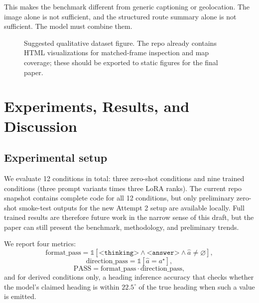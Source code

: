 \documentclass[10pt,twocolumn,letterpaper]{article}
\begin{document}
This makes the benchmark different from generic captioning or geolocation. The image alone is not sufficient, and the structured route summary alone is not sufficient. The model must combine them.

\begin{figure}[t]
\centering
{}
\caption{Suggested qualitative dataset figure. The repo already contains HTML visualizations for matched-frame inspection and map coverage; these should be exported to static figures for the final paper.}
\label{fig:data}
\end{figure}

\section{Experiments, Results, and Discussion}
\subsection{Experimental setup}
We evaluate 12 conditions in total: three zero-shot conditions and nine trained conditions (three prompt variants times three LoRA ranks). The current repo snapshot contains complete code for all 12 conditions, but only preliminary zero-shot smoke-test outputs for the new Attempt 2 setup are available locally. Full trained results are therefore future work in the narrow sense of this draft, but the paper can still present the benchmark, methodology, and preliminary trends.

We report four metrics:
\begin{equation}
\text{format\_pass} = \mathbb{1}[\texttt{<thinking>} \land \texttt{<answer>} \land \hat{a}\neq \varnothing],
\end{equation}
\begin{equation}
\text{direction\_pass} = \mathbb{1}[\hat{a} = a^\star],
\end{equation}
\begin{equation}
\text{PASS} = \text{format\_pass} \cdot \text{direction\_pass},
\end{equation}
and for derived conditions only, a heading inference accuracy that checks whether the model's claimed heading is within $22.5^\circ$ of the true heading when such a value is emitted.
\end{document}
